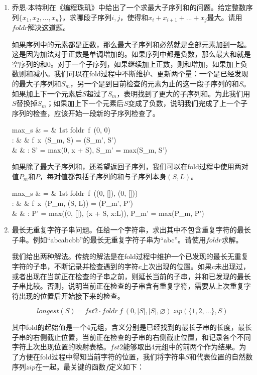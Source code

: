 \documentclass[UTF8]{article}
\begin{document}
\begin{enumerate}
\item 乔恩$\cdot$本特利在《编程珠玑》中给出了一个求最大子序列和的问题。给定整数序列$\{x_1, x_2, ..., x_n\}$，求哪段子序列$i, j$，使得和$x_i + x_{i+1} + ... + x_j$最大。请用$foldr$解决这道题。

如果序列中的元素都是正数，那么最大子序列和必然就是全部元素加到一起。这是因为加法对于正数是单调增加的。如果序列中都是负数，那么最大和就是空序列的和0。对于一个子序列，如果继续加上正数，则和增加，如果加上负数则和减小。我们可以在fold过程中不断维护、更新两个量：一个是已经发现的最大子序列和$S_m$，另一个是到目前检查的元素为止的这一段子序列的和$S$。如果加上下一个元素后$S$超过了$S_m$，表明找到了更大的子序列和。为此我们用$S$替换掉$S_m$；如果加上下一个元素后$S$变成了负数，说明我们完成了上一个子序列的检查，应该开始一段新的子序列检查了。

\blre
max_s & = & 1st \cdot foldr\ f\ (0, 0) \\
: & & f\ x\ (S_m, S) = (S_m', S') \\
& & :  S' = max(0, x + S), S_m' = max(S_m, S') \\
\elre

如果除了最大子序列和，还希望返回子序列，我们可以在fold过程中使用两对值$P_m$和$P$，每对值都包括子序列的和与子序列本身$(S, L)$。

\blre
max_s & = & 1st \cdot foldr\ f\ ((0, []), (0, [])) \\
: & & f\ x\ (P_m, (S, L)) = (P_m', P') \\
& & :  P' = max((0, []), (x + S, x:L)), P_m' = max(P_m, P') \\
\elre

\item 最长无重复字符子串问题。任给一个字符串，求出其中不包含重复字符的最长子串。例如``abcabcbb''的最长无重复字符子串为``abc''。请使用$foldr$求解。

我们给出两种解法。传统的解法是在fold过程中维护一个已发现的最长无重复字符的子串，不断记录并检查遇到的字符$c$上次出现的位置。如果$c$未出现过，或者出现在当前正在检查的子串之前，则延长当前的子串，并和已发现的最长子串比较。否则，说明当前正在检查的子串含有重复字符，需要从上次重复字符出现的位置后开始接下来的检查。

\[
longest(S) = fst2 \cdot foldr\ f\ (0, |S|, |S|, \varnothing)\ zip(\{1, 2, ...\}, S)
\]

其中fold的起始值是一个4元组，含义分别是已经找到的最长子串的长度，最长子串的右侧截止位置，当前正在检查的子串的右侧截止位置，和记录各个不同字符上次出现位置的映射表格。$fst2$能够取出4元组中的前两个作为结果。为了方便在fold过程中得知当前字符的位置，我们将字符串$S$和代表位置的自然数序列$zip$在一起。最关键的函数$f$定义如下：


\end{enumerate}
\end{document}
